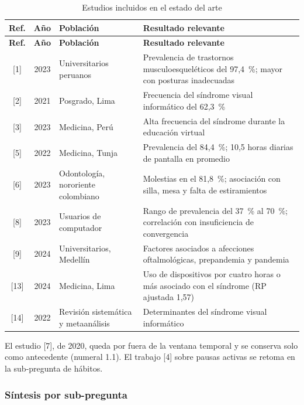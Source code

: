 \bigskip
\begin{center}
\small
\begin{longtable}{c c L{3.4cm} L{7.6cm}}
\caption{Estudios incluidos en el estado del arte}\label{tab:incluidos} \\
\toprule
\textbf{Ref.} & \textbf{Año} & \textbf{Población} & \textbf{Resultado relevante} \\
\midrule
\endfirsthead
\toprule
\textbf{Ref.} & \textbf{Año} & \textbf{Población} & \textbf{Resultado relevante} \\
\midrule
\endhead
{[1]} & 2023 & Universitarios peruanos & Prevalencia de trastornos musculoesqueléticos del 97,4~\%; mayor con posturas inadecuadas \\
{[2]} & 2021 & Posgrado, Lima & Frecuencia del síndrome visual informático del 62,3~\% \\
{[3]} & 2023 & Medicina, Perú & Alta frecuencia del síndrome durante la educación virtual \\
{[5]} & 2022 & Medicina, Tunja & Prevalencia del 84,4~\%; 10,5 horas diarias de pantalla en promedio \\
{[6]} & 2023 & Odontología, nororiente colombiano & Molestias en el 81,8~\%; asociación con silla, mesa y falta de estiramientos \\
{[8]} & 2023 & Usuarios de computador & Rango de prevalencia del 37~\% al 70~\%; correlación con insuficiencia de convergencia \\
{[9]} & 2024 & Universitarios, Medellín & Factores asociados a afecciones oftalmológicas, prepandemia y pandemia \\
{[13]} & 2024 & Medicina, Lima & Uso de dispositivos por cuatro horas o más asociado con el síndrome (RP ajustada 1,57) \\
{[14]} & 2022 & Revisión sistemática y metaanálisis & Determinantes del síndrome visual informático \\
\bottomrule
\end{longtable}
\end{center}

\noindent El estudio [7], de 2020, queda por fuera de la ventana temporal y se conserva solo como antecedente
(numeral 1.1). El trabajo [4] sobre pausas activas se retoma en la sub-pregunta de
hábitos.

\subsubsection*{Síntesis por sub-pregunta}


